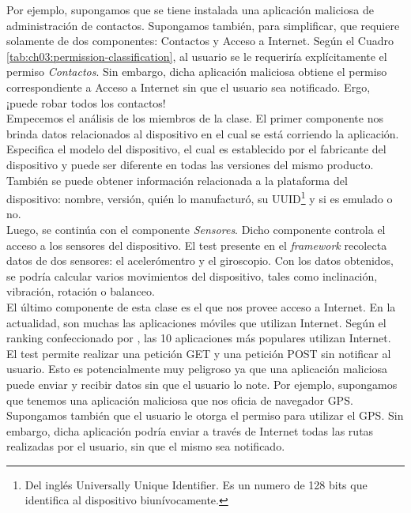 Por ejemplo, supongamos que se tiene instalada una aplicación maliciosa de administración de contactos. Supongamos también, para simplificar, que requiere solamente de dos componentes: Contactos y Acceso a Internet. Según el Cuadro \ref{tab:ch03:permission-classification}, al usuario se le requeriría explícitamente el permiso \emph{Contactos}. Sin embargo, dicha aplicación maliciosa obtiene el permiso correspondiente a Acceso a Internet sin que el usuario sea notificado. Ergo, ¡puede robar todos los contactos!\\

Empecemos el análisis de los miembros de la clase. El primer componente nos brinda datos relacionados al dispositivo en el cual se está corriendo la aplicación. Especifica el modelo del dispositivo, el cual es establecido por el fabricante del dispositivo y puede ser diferente en todas las versiones del mismo producto. También se puede obtener información relacionada a la plataforma del dispositivo: nombre, versión, quién lo manufacturó, su UUID\footnote{Del inglés Universally Unique Identifier. Es un numero de 128 bits que identifica al dispositivo biunívocamente.} y si es emulado o no.\\

Luego, se continúa con el componente \emph{Sensores}. Dicho componente controla el acceso a los sensores del dispositivo. El test presente en el \textit{framework} recolecta datos de dos sensores: el acelerómentro y el giroscopio. Con los datos obtenidos, se podría calcular varios movimientos del dispositivo, tales como inclinación, vibración, rotación o balanceo.\\

El último componente de esta clase es el que nos provee acceso a Internet. En la actualidad, son muchas las aplicaciones móviles que utilizan Internet. Según el ranking confeccionado por \cite{BOA}, las 10 aplicaciones más populares utilizan Internet. El test permite realizar una petición GET y una petición POST sin notificar al usuario. Esto es potencialmente muy peligroso ya que una aplicación maliciosa puede enviar y recibir datos sin que el usuario lo note. Por ejemplo, supongamos que tenemos una aplicación maliciosa que nos oficia de navegador GPS. Supongamos también que el usuario le otorga el permiso para utilizar el GPS. Sin embargo, dicha aplicación podría enviar a través de Internet todas las rutas realizadas por el usuario, sin que el mismo sea notificado.